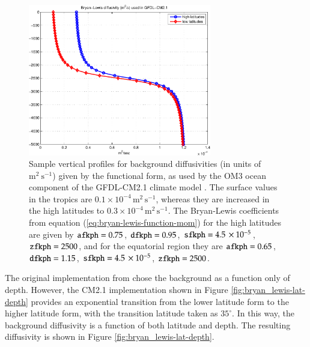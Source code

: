 \begin{figure}[h!t]
\begin{center}
\includegraphics[angle=0,width=8cm,bb=0 0 484 401]{./figs/bryan_lewis_cm2p1.pdf}
\caption[Bryan-Lewis background diffusivities]{\sf Sample vertical
  profiles for background diffusivities (in units of
  $\mbox{m}^{2}~\mbox{s}^{-1}$) given by the \cite{BryanLewis1979}
  functional form, as used by the OM3 ocean component of the
  GFDL-CM2.1 climate model \citep{OMDT2005a}.  The surface values in
  the tropics are $0.1 \times 10^{-4} \, \mbox{m}^2 \, \mbox{s}^{-1}$,
  whereas they are increased in the high latitudes to $0.3 \times
  10^{-4} \, \mbox{m}^2 \, \mbox{s}^{-1}$.
The Bryan-Lewis coefficients from equation
(\ref{eq:bryan-lewis-function-mom}) for the high latitudes are given
by 
${\tt afkph} =0.75$,
${\tt dfkph} =0.95$,
${\tt sfkph} =4.5 \, \times 10^{-5}$,
${\tt zfkph} =2500$,
and for the equatorial region they are 
${\tt afkph} =0.65$,
${\tt dfkph} =1.15$,
${\tt sfkph} = 4.5 \, \times 10^{-5}$,
${\tt zfkph} =2500$. }
\label{fig:bryan_lewis-profiles}
\end{center}
\end{figure}

The original implementation from \cite{BryanLewis1979} chose the
background as a function only of depth.  However, the CM2.1
implementation shown in Figure \ref{fig:bryan_lewis-lat-depth}
provides an exponential transition from the lower latitude form to the
higher latitude form, with the transition latitude taken as
$35^{\circ}$.  In this way, the background diffusivity is a function
of both latitude and depth.  The resulting diffusivity is shown in
Figure \ref{fig:bryan_lewis-lat-depth}.

